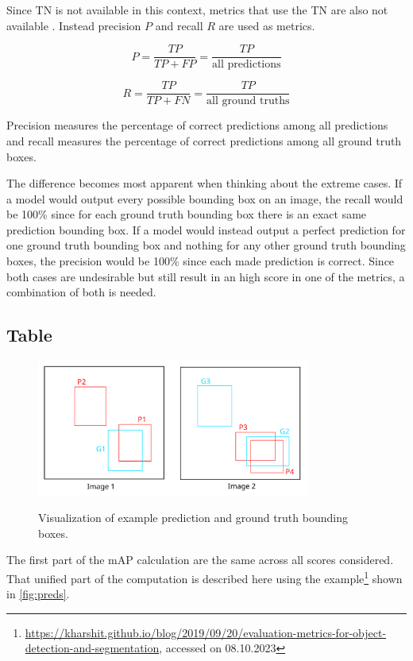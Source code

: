 \documentclass[10pt]{book}
\newcommand{\figureref}[1]{\autoref{#1}}
\begin{document}
Since \ac{TN} is not available in this context, metrics that use the \ac{TN} are also not available \cite{padilla2020survey}. Instead precision $P$ and recall $R$ are used as metrics.

$$P = \frac{TP}{TP + FP} = \frac{TP}{\text{all predictions}}$$

$$R = \frac{TP}{TP + FN} = \frac{TP}{\text{all ground truths}}$$

Precision measures the percentage of correct predictions among all predictions and recall measures the percentage of correct predictions among all ground truth boxes. 

The difference becomes most apparent when thinking about the extreme cases. If a model would output every possible bounding box on an image, the recall would be 100\% since for each ground truth bounding box there is an exact same prediction bounding box. If a model would instead output a perfect prediction for one ground truth bounding box and nothing for any other ground truth bounding boxes, the precision would be 100\% since each made prediction is correct. Since both cases are undesirable but still result in an high score in one of the metrics, a combination of both is needed.

\subsection{Table}

\begin{figure}
  \caption{Visualization of example prediction and ground truth bounding boxes.}
  \includegraphics[width=0.8\textwidth]{image/preds}
  \label{fig:preds}
\end{figure}

The first part of the \ac{mAP} calculation are the same across all scores considered. That unified part of the computation is described here using the example\footnote{\url{https://kharshit.github.io/blog/2019/09/20/evaluation-metrics-for-object-detection-and-segmentation}, accessed on 08.10.2023} shown in \figureref{fig:preds}. 
\end{document}
